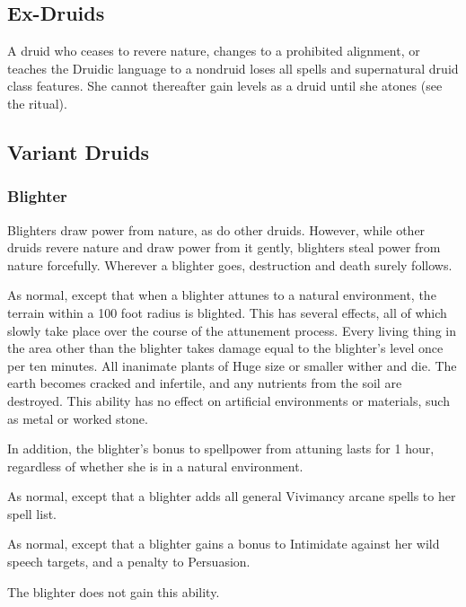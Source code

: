 \subsection{Ex-Druids}
A druid who ceases to revere nature, changes to a prohibited alignment, or teaches the Druidic language to a nondruid loses all spells and supernatural druid class features.
She cannot thereafter gain levels as a druid until she atones (see the  ritual).

\subsection{Variant Druids}

\subsubsection{Blighter}

Blighters draw power from nature, as do other druids. However, while other druids revere nature and draw power from it gently, blighters steal power from nature forcefully. Wherever a blighter goes, destruction and death surely follows.

 As normal, except that when a blighter attunes to a natural environment, the terrain within a 100 foot radius is blighted.
This has several effects, all of which slowly take place over the course of the attunement process.
Every living thing in the area other than the blighter takes damage equal to the blighter's level once per ten minutes.
All inanimate plants of Huge size or smaller wither and die.
The earth becomes cracked and infertile, and any nutrients from the soil are destroyed.
This ability has no effect on artificial environments or materials, such as metal or worked stone.

In addition, the blighter's bonus to spellpower from attuning lasts for 1 hour, regardless of whether she is in a natural environment.

 As normal, except that a blighter adds all general Vivimancy arcane spells to her spell list.

 As normal, except that a blighter gains a  bonus to Intimidate against her wild speech targets, and a  penalty to Persuasion.

 The blighter does not gain this ability.



